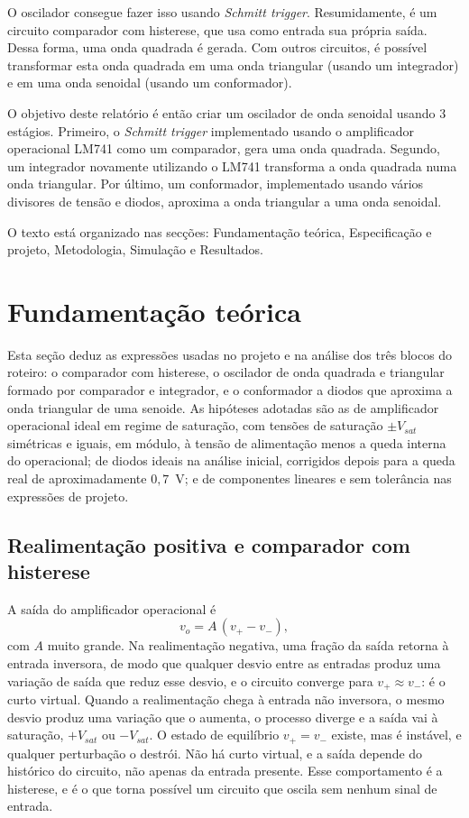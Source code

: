 \documentclass[11pt,a4paper]{article}
\begin{document}
O oscilador consegue fazer isso usando \textit{Schmitt trigger}. Resumidamente, é um circuito comparador com
histerese, que usa como entrada sua própria saída. Dessa forma, uma onda quadrada é gerada. Com outros
circuitos, é possível transformar esta onda quadrada em uma onda triangular (usando um integrador) e
em uma onda senoidal (usando um conformador).

O objetivo deste relatório é então criar um oscilador de onda senoidal usando 3 estágios. Primeiro, o \textit{Schmitt trigger}
implementado usando o amplificador operacional LM741 como um comparador, gera uma onda quadrada. Segundo,
um integrador novamente utilizando o LM741 transforma a onda quadrada numa onda triangular. Por último, um conformador,
implementado usando vários divisores de tensão e diodos, aproxima a onda triangular a uma onda senoidal.

O texto está organizado nas secções: Fundamentação teórica, Especificação e projeto, Metodologia, Simulação e Resultados.

\section{Fundamentação teórica}
\label{sec:fundamentacao}
 
Esta seção deduz as expressões usadas no projeto e na análise dos três blocos do
roteiro: o comparador com histerese, o oscilador de onda quadrada e triangular
formado por comparador e integrador, e o conformador a diodos que aproxima a
onda triangular de uma senoide. As hipóteses adotadas são as de amplificador
operacional ideal em regime de saturação, com tensões de saturação
$\pm V_{sat}$ simétricas e iguais, em módulo, à tensão de alimentação menos a
queda interna do operacional; de diodos ideais na análise inicial, corrigidos
depois para a queda real de aproximadamente $0{,}7$~V; e de componentes
lineares e sem tolerância nas expressões de projeto.
 
\subsection{Realimentação positiva e comparador com histerese}
\label{sec:teo_histerese}
 
A saída do amplificador operacional é
\begin{equation}
v_o = A\,(v_+ - v_-),
\label{eq:ganho_aberto}
\end{equation}
com $A$ muito grande. Na realimentação negativa, uma fração da saída retorna à
entrada inversora, de modo que qualquer desvio entre as entradas produz uma
variação de saída que reduz esse desvio, e o circuito converge para
$v_+ \approx v_-$: é o curto virtual. Quando a realimentação chega à entrada
não inversora, o mesmo desvio produz uma variação que o aumenta, o processo
diverge e a saída vai à saturação, $+V_{sat}$ ou $-V_{sat}$. O estado de
equilíbrio $v_+ = v_-$ existe, mas é instável, e qualquer perturbação o
destrói. Não há curto virtual, e a saída depende do histórico do circuito, não
apenas da entrada presente. Esse comportamento é a histerese, e é o que torna
possível um circuito que oscila sem nenhum sinal de entrada.
 
\end{document}
